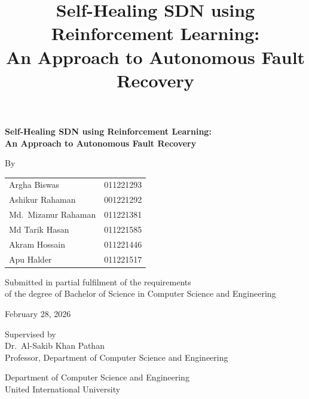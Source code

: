 \documentclass[12pt,a4paper]{report}
\title{\textbf{Self-Healing SDN using Reinforcement Learning:\\
An Approach to Autonomous Fault Recovery}}
\author{}
\date{}
\begin{document}
\begin{titlepage}
\centering
\vspace*{2cm}
{\LARGE\bfseries Self-Healing SDN using Reinforcement Learning:\\[6pt]
An Approach to Autonomous Fault Recovery\par}
\vspace{2cm}
{\large By\par}
\vspace{0.5cm}
\begin{tabular}{ll}
Argha Biswas & 011221293\\
Ashikur Rahaman & 001221292\\
Md.\ Mizanur Rahaman & 011221381\\
Md Tarik Hasan & 011221585\\
Akram Hossain & 011221446\\
Apu Halder & 011221517\\
\end{tabular}
\vspace{1.5cm}

{\large Submitted in partial fulfilment of the requirements\\
of the degree of Bachelor of Science in Computer Science and Engineering\par}
\vspace{1cm}
{\large February 28, 2026\par}
\vspace{1.5cm}
{\large Supervised by\\ Dr.\ Al-Sakib Khan Pathan\\ Professor, Department of Computer
Science and Engineering\par}
\vspace{1cm}
{\large Department of Computer Science and Engineering\\
United International University\par}
\end{titlepage}

\end{document}
